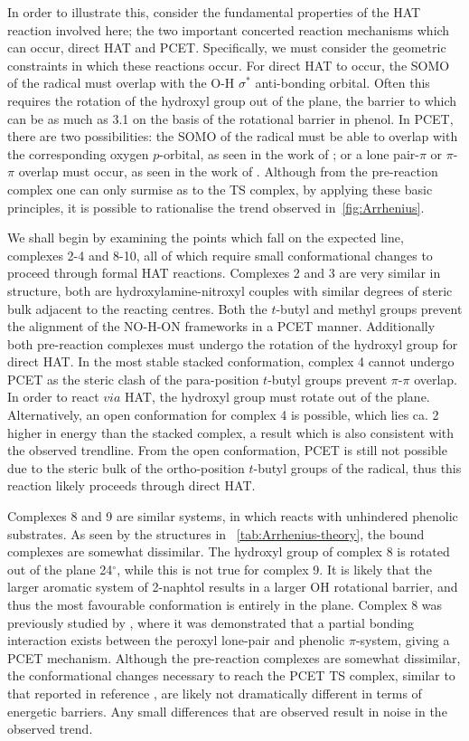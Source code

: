In order to illustrate this, consider the fundamental properties of the HAT reaction involved here; the two important concerted reaction mechanisms which can occur, direct HAT and PCET. Specifically, we must consider the geometric constraints in which these reactions occur. For direct HAT to occur, the SOMO of the radical must overlap with the O-H $\sigma^*$ anti-bonding orbital. Often this requires the rotation of the hydroxyl group out of the plane, the barrier to which can be as much as 3.1 \kcalmol on the basis of the rotational barrier in phenol.\cite{Kim1994} In PCET, there are two possibilities: the SOMO of the radical must be able to overlap with the corresponding oxygen $p$-orbital, as seen in the work of \citet{Mayer2002}; or a lone pair-$\pi$ or $\pi$-$\pi$ overlap must occur, as seen in the work of \citet{DiLabio2007}. Although from the pre-reaction complex one can only surmise as to the TS complex, by applying these basic principles, it is possible to rationalise the trend observed in~\ref{fig:Arrhenius}.

We shall begin by examining the points which fall on the expected line, complexes 2-4 and 8-10, all of which require small conformational changes to proceed through formal HAT reactions. Complexes 2 and 3 are very similar in structure, both are hydroxylamine-nitroxyl couples with similar degrees of steric bulk adjacent to the reacting centres. Both the $t$-butyl and methyl groups prevent the alignment of the NO-H-ON frameworks in a PCET manner. Additionally both pre-reaction complexes must undergo the rotation of the hydroxyl group for direct HAT. In the most stable stacked conformation, complex 4 cannot undergo PCET as the steric clash of the para-position $t$-butyl groups prevent $\pi$-$\pi$ overlap. In order to react $via$ HAT, the hydroxyl group must rotate out of the plane. Alternatively, an open conformation for complex 4 is possible, which lies ca. 2 \kcalmol higher in energy than the stacked complex, a result which is also consistent with the observed trendline. From the open conformation, PCET is still not possible due to the steric bulk of the ortho-position $t$-butyl groups of the radical, thus this reaction likely proceeds through direct HAT.

Complexes 8 and 9 are similar systems, in which  reacts with unhindered phenolic substrates. As seen by the structures in ~\ref{tab:Arrhenius-theory}, the bound complexes are somewhat dissimilar. The hydroxyl group of complex 8 is rotated out of the plane 24$^\circ$, while this is not true for complex 9. It is likely that the larger aromatic system of 2-naphtol results in a larger OH rotational barrier, and thus the most favourable conformation is entirely in the plane. Complex 8 was previously studied by \citet{DiLabio2007}, where it was demonstrated that a partial bonding interaction exists between the peroxyl lone-pair and phenolic $\pi$-system, giving a PCET mechanism. Although the pre-reaction complexes are somewhat dissimilar, the conformational changes necessary to reach the PCET TS complex, similar to that reported in reference , are likely not dramatically different in terms of energetic barriers. Any small differences that are observed result in noise in the observed trend.

